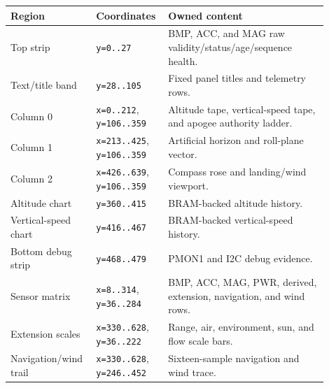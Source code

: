 \documentclass{article}
\newcommand{\sig}[1]{\begingroup\nolinkurl{#1}\endgroup}
\begin{document}
\begin{longtable}{p{0.24\linewidth} p{0.18\linewidth} p{0.48\linewidth}}
\toprule
\textbf{Region} & \textbf{Coordinates} & \textbf{Owned content} \\
\midrule
\endhead
Top strip & \sig{y=0..27} & BMP, ACC, and MAG raw validity/status/age/sequence health. \\
Text/title band & \sig{y=28..105} & Fixed panel titles and telemetry rows. \\
Column 0 & \sig{x=0..212}, \sig{y=106..359} & Altitude tape, vertical-speed tape, and apogee authority ladder. \\
Column 1 & \sig{x=213..425}, \sig{y=106..359} & Artificial horizon and roll-plane vector. \\
Column 2 & \sig{x=426..639}, \sig{y=106..359} & Compass rose and landing/wind viewport. \\
Altitude chart & \sig{y=360..415} & BRAM-backed altitude history. \\
Vertical-speed chart & \sig{y=416..467} & BRAM-backed vertical-speed history. \\
Bottom debug strip & \sig{y=468..479} & PMON1 and I2C debug evidence. \\
\midrule
Sensor matrix & \sig{x=8..314}, \sig{y=36..284} & BMP, ACC, MAG, PWR, derived, extension, navigation, and wind rows. \\
Extension scales & \sig{x=330..628}, \sig{y=36..222} & Range, air, environment, sun, and flow scale bars. \\
Navigation/wind trail & \sig{x=330..628}, \sig{y=246..452} & Sixteen-sample navigation and wind trace. \\
\bottomrule
\end{longtable}
\end{document}
